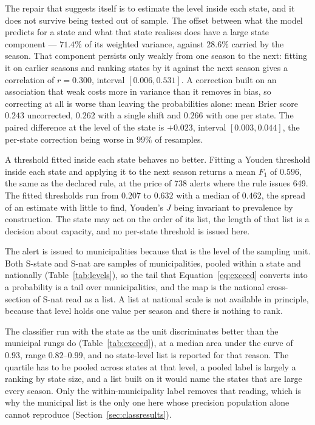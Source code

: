 \documentclass[english,10pt,b5paper]{article}
\newcommand{\lvl}[1]{\mbox{#1}}
\begin{document}


The repair that suggests itself is to estimate the level inside each state,
and it does not survive being tested out of sample. The offset between what
the model predicts for a state and what that state realises does have a large
state component --- $71.4\%$ of its weighted variance, against $28.6\%$
carried by the season. That component persists only weakly from one season to
the next: fitting it on earlier seasons and ranking states by it against the
next season gives a correlation of $r=0.300$, interval $[0.006, 0.531]$. A
correction built on an association that weak costs more in variance than it
removes in bias, so correcting at all is worse than leaving the probabilities
alone: mean Brier score $0.243$ uncorrected, $0.262$ with a single shift and
$0.266$ with one per state. The paired difference at the level of the state is
$+0.023$, interval $[0.003, 0.044]$, the per-state correction being worse in
$99\%$ of resamples.

A threshold fitted inside each state behaves no better. Fitting a Youden threshold
inside each state and applying it to the next season returns a mean $F_1$ of
$0.596$, the same as the declared rule, at the price of 738 alerts where the rule
issues 649. The fitted thresholds run from $0.207$ to $0.632$ with a median of
$0.462$, the spread of an estimate with little to find, Youden's $J$ being
invariant to prevalence by construction. The state may act on the order of its
list, the length of that list is a decision about capacity, and no per-state
threshold is issued here.

The alert is issued to municipalities because that is the level of the
sampling unit. Both \lvl{S-state} and \lvl{S-nat} are samples of
municipalities, pooled within a state and nationally (Table~\ref{tab:levels}),
so the tail that Equation~\eqref{eq:exceed} converts into a probability is a
tail over municipalities, and the map is the national cross-section of
\lvl{S-nat} read as a list. A list at national scale is not available in
principle, because that level holds one value per season and there is nothing
to rank.

The classifier run with the state as the unit discriminates better than the
municipal rungs do (Table~\ref{tab:exceed}), at a median area under the curve of
$0.93$, range $0.82$--$0.99$, and no state-level list is reported for that reason.
The quartile has to be pooled across states at that level, a pooled label is
largely a ranking by state size, and a list built on it would name the states that
are large every season. Only the within-municipality label removes that reading,
which is why the municipal list is the only one here whose precision population
alone cannot reproduce (Section~\ref{sec:classresults}).
\end{document}
